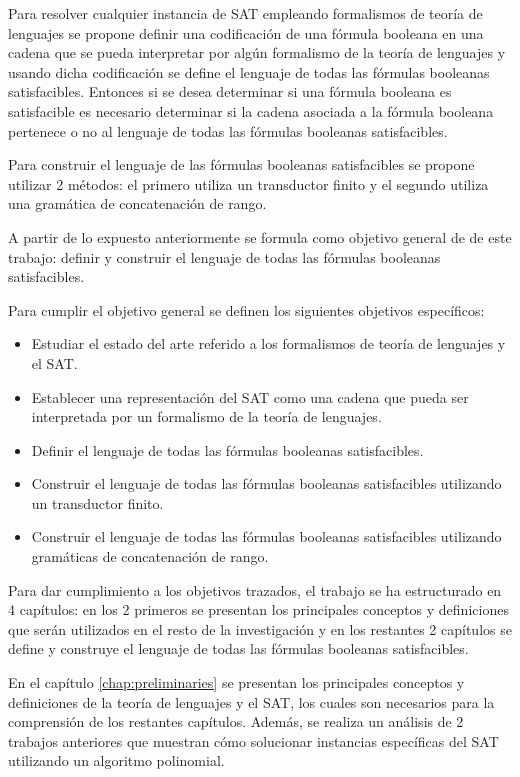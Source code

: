 Para resolver cualquier instancia de SAT empleando formalismos de teoría de lenguajes se propone definir una codificación
de una fórmula booleana en una cadena que se pueda interpretar por algún formalismo de la teoría de lenguajes
y usando dicha codificación se define el lenguaje de todas las fórmulas booleanas satisfacibles. Entonces si se desea
determinar si una fórmula booleana es satisfacible es necesario determinar si la cadena asociada a la  fórmula booleana pertenece o no al lenguaje de todas las fórmulas booleanas satisfacibles.

Para construir el lenguaje
de las fórmulas booleanas satisfacibles se propone utilizar 2 métodos: el primero utiliza un transductor finito y el segundo
utiliza una gramática de concatenación de rango.

A partir de lo expuesto anteriormente se formula como objetivo general de de este trabajo: definir y construir el lenguaje de todas las fórmulas booleanas satisfacibles.

Para cumplir el objetivo general se definen los siguientes objetivos específicos:

\begin{itemize}
      \item Estudiar el estado del arte referido a los formalismos de teoría de lenguajes y el SAT.
      \item Establecer una representación del SAT como una cadena que pueda ser interpretada por un formalismo de la teoría de lenguajes.
      \item Definir el lenguaje de todas las fórmulas booleanas satisfacibles.
      \item Construir el lenguaje de todas las fórmulas booleanas satisfacibles utilizando un transductor finito.
      \item Construir el lenguaje de todas las fórmulas booleanas satisfacibles utilizando gramáticas de concatenación de rango.
\end{itemize}

Para dar cumplimiento a los objetivos trazados, el trabajo se ha estructurado en 4 capítulos: en los 2 primeros se presentan los principales conceptos y definiciones
que serán utilizados en el resto de la investigación y en los restantes 2 capítulos se define y construye el lenguaje de todas las fórmulas booleanas satisfacibles.

En el capítulo \ref{chap:preliminaries} se presentan los principales conceptos y definiciones de la teoría de lenguajes y el SAT, los cuales
son necesarios para la comprensión de los restantes capítulos. Además, se realiza un análisis de 2 trabajos anteriores
que muestran cómo solucionar instancias específicas del SAT utilizando un algoritmo polinomial.

